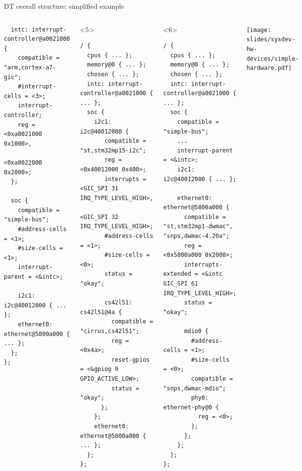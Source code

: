 \begin{frame}[fragile]{DT overall structure: simplified example}
\begin{columns}
\begin{onlyenv}
\begin{block}{}
\begin{verbatim}
  intc: interrupt-controller@a0021000 {
    compatible = "arm,cortex-a7-gic";
    #interrupt-cells = <3>;
    interrupt-controller;
    reg = <0xa0021000 0x1000>,
          <0xa0022000 0x2000>;
  };

  soc {
    compatible = "simple-bus";
    #address-cells = <1>;
    #size-cells = <1>;
    interrupt-parent = <&intc>;

    i2c1: i2c@40012000 { ... };
    ethernet0: ethernet@5800a000 { ... };
  };
};
\end{verbatim}
      \end{block}
    \end{onlyenv}
    \begin{onlyenv}<5>
      \begin{block}{}
\begin{verbatim}
/ {
  cpus { ... };
  memory@0 { ... };
  chosen { ... };
  intc: interrupt-controller@a0021000 { ... };
  soc {
    i2c1: i2c@40012000 {
       compatible = "st,stm32mp15-i2c";
       reg = <0x40012000 0x400>;
       interrupts = <GIC_SPI 31 IRQ_TYPE_LEVEL_HIGH>,
               <GIC_SPI 32 IRQ_TYPE_LEVEL_HIGH>;
       #address-cells = <1>;
       #size-cells = <0>;
       status = "okay";

       cs42l51: cs42l51@4a {
         compatible = "cirrus,cs42l51";
         reg = <0x4a>;
         reset-gpios = <&gpiog 9 GPIO_ACTIVE_LOW>;
         status = "okay";
      };
    };
    ethernet0: ethernet@5800a000 { ... };
  };
};
\end{verbatim}
      \end{block}
    \end{onlyenv}
    \begin{onlyenv}<6>
      \begin{block}{}
\begin{verbatim}
/ {
  cpus { ... };
  memory@0 { ... };
  chosen { ... };
  intc: interrupt-controller@a0021000 { ... };
  soc {
    compatible = "simple-bus";
    ...
    interrupt-parent = <&intc>;
    i2c1: i2c@40012000 { ... };

    ethernet0: ethernet@5800a000 {
      compatible = "st,stm32mp1-dwmac", "snps,dwmac-4.20a";
      reg = <0x5800a000 0x2000>;
      interrupts-extended = <&intc GIC_SPI 61 IRQ_TYPE_LEVEL_HIGH>;
      status = "okay";

      mdio0 {
        #address-cells = <1>;
        #size-cells = <0>;
        compatible = "snps,dwmac-mdio";
        phy0: ethernet-phy@0 {
          reg = <0>;
        };
      };
    };
  };
};
\end{verbatim}
      \end{block}
    \end{onlyenv}
    \texttt{[image: slides/sysdev-hw-devices/simple-hardware.pdf]}
  \end{columns}
\end{frame}

